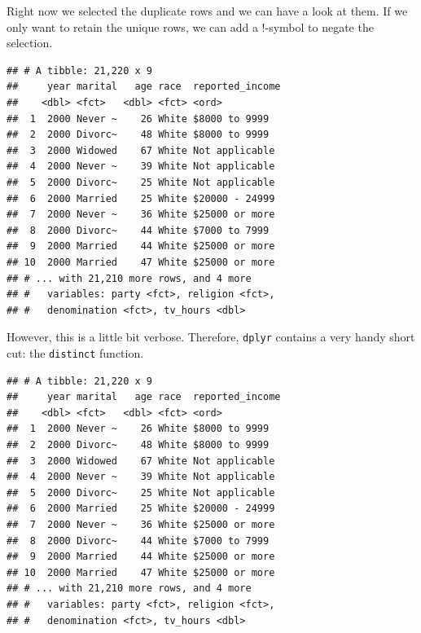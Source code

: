 \documentclass[]{tufte-book}
\newenvironment{Shaded}{}{}
\newcommand{\KeywordTok}[1]{\textcolor[rgb]{0.00,0.44,0.13}{\textbf{#1}}}
\newcommand{\StringTok}[1]{\textcolor[rgb]{0.25,0.44,0.63}{#1}}
\newcommand{\OperatorTok}[1]{\textcolor[rgb]{0.40,0.40,0.40}{#1}}
\newcommand{\NormalTok}[1]{#1}
\begin{document}
Right now we selected the duplicate rows and we can have a look at them.
If we only want to retain the unique rows, we can add a !-symbol to
negate the selection.

\begin{Shaded}
\end{Shaded}

\begin{verbatim}
## # A tibble: 21,220 x 9
##     year marital   age race  reported_income
##    <dbl> <fct>   <dbl> <fct> <ord>          
##  1  2000 Never ~    26 White $8000 to 9999  
##  2  2000 Divorc~    48 White $8000 to 9999  
##  3  2000 Widowed    67 White Not applicable 
##  4  2000 Never ~    39 White Not applicable 
##  5  2000 Divorc~    25 White Not applicable 
##  6  2000 Married    25 White $20000 - 24999 
##  7  2000 Never ~    36 White $25000 or more 
##  8  2000 Divorc~    44 White $7000 to 7999  
##  9  2000 Married    44 White $25000 or more 
## 10  2000 Married    47 White $25000 or more 
## # ... with 21,210 more rows, and 4 more
## #   variables: party <fct>, religion <fct>,
## #   denomination <fct>, tv_hours <dbl>
\end{verbatim}

However, this is a little bit verbose. Therefore, \texttt{dplyr}
contains a very handy short cut: the \texttt{distinct} function.

\begin{Shaded}
\end{Shaded}

\begin{verbatim}
## # A tibble: 21,220 x 9
##     year marital   age race  reported_income
##    <dbl> <fct>   <dbl> <fct> <ord>          
##  1  2000 Never ~    26 White $8000 to 9999  
##  2  2000 Divorc~    48 White $8000 to 9999  
##  3  2000 Widowed    67 White Not applicable 
##  4  2000 Never ~    39 White Not applicable 
##  5  2000 Divorc~    25 White Not applicable 
##  6  2000 Married    25 White $20000 - 24999 
##  7  2000 Never ~    36 White $25000 or more 
##  8  2000 Divorc~    44 White $7000 to 7999  
##  9  2000 Married    44 White $25000 or more 
## 10  2000 Married    47 White $25000 or more 
## # ... with 21,210 more rows, and 4 more
## #   variables: party <fct>, religion <fct>,
## #   denomination <fct>, tv_hours <dbl>
\end{verbatim}
\end{document}
